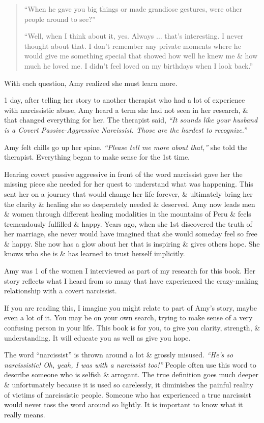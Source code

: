 \documentclass{article}
\numberwithin{equation}{section}
\begin{document}
\begin{quotation}
	``When he gave you big things or made grandiose gestures, were other people around to see?''
	
	``Well, when I think about it, yes. Always $\ldots$ that's interesting. I never thought about that. I don't remember any private moments where he would give me something special that showed how well he knew me \& how much he loved me. I didn't feel loved on my birthdays when I look back.''
\end{quotation}
With each question, Amy realized she must learn more.

1 day, after telling her story to another therapist who had a lot of experience with narcissistic abuse, Amy heard a term she had not seen in her research, \& that changed everything for her. The therapist said, \textit{``It sounds like your husband is a Covert Passive-Aggressive Narcissist. Those are the hardest to recognize.''}

Amy felt chills go up her spine. \textit{``Please tell me more about that,''} she told the therapist. Everything began to make sense for the 1st time.

Hearing covert passive aggressive in front of the word narcissist gave her the missing piece she needed for her quest to understand what was happening. This sent her on a journey that would change her life forever, \& ultimately bring her the clarity \& healing she so desperately needed \& deserved. Amy now leads men \& women through different healing modalities in the mountains of Peru \& feels tremendously fulfilled \& happy. Years ago, when she 1st discovered the truth of her marriage, she never would have imagined that she would someday feel so free \& happy. She now has a glow about her that is inspiring \& gives others hope. She knows who she is \& has learned to trust herself implicitly.

Amy was 1 of the women I interviewed as part of my research for this book. Her story reflects what I heard from so many that have experienced the crazy-making relationship with a covert narcissist.

If you are reading this, I imagine you might relate to part of Amy's story, maybe even a lot of it. You may be on your own search, trying to make sense of a very confusing person in your life. This book is for you, to give you clarity, strength, \& understanding. It will educate you as well as give you hope.

The word ``narcissist'' is thrown around a lot \& grossly misused. \textit{``He's so narcissistic! Oh, yeah, I was with a narcissist too!''} People often use this word to describe someone who is selfish \& arrogant. The true definition goes much deeper \& unfortunately because it is used so carelessly, it diminishes the painful reality of victims of narcissistic people. Someone who has experienced a true narcissist would never toss the word around so lightly. It is important to know what it really means.
\end{document}
